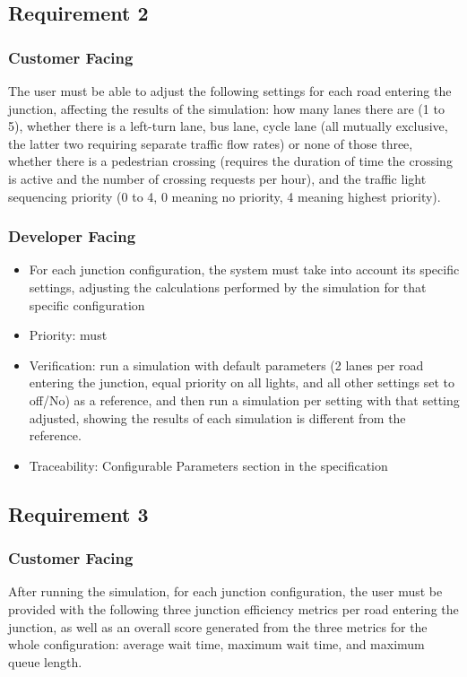 \documentclass{article}
\begin{document}
\subsection{Requirement 2}
\subsubsection{Customer Facing}
The user must be able to adjust the following settings for each 
road entering the junction, affecting the results of the simulation: how many 
lanes there are (1 to 5), whether there is a left-turn lane, bus lane, cycle 
lane (all mutually exclusive, the latter two requiring separate traffic flow rates) 
or none of those three, whether there is a pedestrian crossing (requires the duration 
of time the crossing is active and the number of crossing requests per hour), 
and the traffic light sequencing priority (0 to 4, 0 meaning no priority, 4 
meaning highest priority).
\subsubsection{Developer Facing}
\begin{itemize}
  \item For each junction configuration, the system must take into account 
  its specific settings, adjusting the calculations performed by the simulation 
  for that specific configuration
  \item Priority: must
  \item Verification: run a simulation with default parameters (2 lanes per 
  road entering the junction, equal priority on all lights, and all other 
  settings set to off/No) as a reference, and then run a simulation per setting 
  with that setting adjusted, showing the results of each simulation is different 
  from the reference.
  \item Traceability: Configurable Parameters section in the specification
\end{itemize}

\subsection{Requirement 3}
\subsubsection{Customer Facing}
After running the simulation, for each junction configuration, 
the user must be provided with the following three junction efficiency metrics 
per road entering the junction, as well as an overall score generated from the 
three metrics for the whole configuration: average wait time, maximum wait time, 
and maximum queue length.
\end{document}

